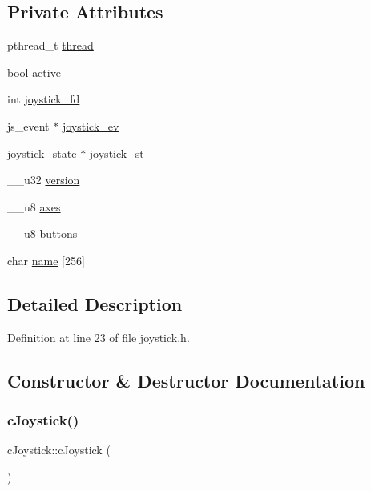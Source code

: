 \subsection*{Private Attributes}
\begin{DoxyCompactItemize}
\item 
pthread\+\_\+t \hyperlink{classc_joystick_ac95e179f087f21a4d364cf6e9984d60b}{thread}
\item 
bool \hyperlink{classc_joystick_a76b927cfdc179f053256952d0d94656d}{active}
\item 
int \hyperlink{classc_joystick_a23bb9ae8f441e6974b383aae6ae8bea6}{joystick\+\_\+fd}
\item 
js\+\_\+event $\ast$ \hyperlink{classc_joystick_ae4af08aaa67a7f0c0575d65ff4987017}{joystick\+\_\+ev}
\item 
\hyperlink{structjoystick__state}{joystick\+\_\+state} $\ast$ \hyperlink{classc_joystick_a6962bb01a3326201b9cf3ba403fe0f21}{joystick\+\_\+st}
\item 
\+\_\+\+\_\+u32 \hyperlink{classc_joystick_afefd351be965e4953b5eb03073e99ad9}{version}
\item 
\+\_\+\+\_\+u8 \hyperlink{classc_joystick_ada53890948b0afe1b49b4c2ff2970c77}{axes}
\item 
\+\_\+\+\_\+u8 \hyperlink{classc_joystick_ae493e39825c273556d4807cb31d047e0}{buttons}
\item 
char \hyperlink{classc_joystick_a4352d02cdee851f9c8c104915d3c006c}{name} \mbox{[}256\mbox{]}
\end{DoxyCompactItemize}


\subsection{Detailed Description}


Definition at line 23 of file joystick.\+h.



\subsection{Constructor \& Destructor Documentation}
\mbox{\label{classc_joystick_ae4edecc3589f19b068113cdb79f7b39d}} 
\subsubsection{\texorpdfstring{c\+Joystick()}{cJoystick()}}
{\footnotesize\ttfamily c\+Joystick\+::c\+Joystick (\begin{DoxyParamCaption}{ }\end{DoxyParamCaption})}



